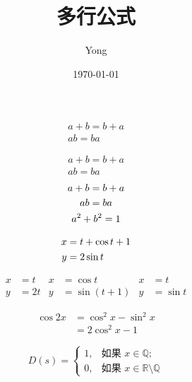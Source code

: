 \documentclass{article}
\title{多行公式}
\author{Yong}
\date{\today}
\begin{document}
	\maketitle
	
	\begin{gather}
		a + b = b + a \\
		ab = ba
	\end{gather}
	
	\begin{gather*}
	a + b = b + a \\
	ab = ba
	\end{gather*}
	\begin{gather}
	a + b = b + a \notag \\
	ab = ba \notag \\
	a^2 + b^2 = 1
	\end{gather}
	
	\begin{align}
		x &= t + \cos t + 1 \notag \\
		y &= 2\sin t
	\end{align}
	
	\begin{align*}
		x &= t & x &= \cos t & x &=t \\
		y &= 2t & y &= \sin (t + 1) & y &= \sin t
	\end{align*}
	
	\begin{equation}
		\begin{split}
			\cos 2x &= \cos^2 x - \sin^2 x \\
			&= 2\cos^2 x - 1
		\end{split}
	\end{equation}
	
	\begin{equation}
		D(s) = \begin{cases}
		1, & \text{如果 } x \in \mathbb{Q}; \\
		0, & \text{如果 } x \in \mathbb{R} \setminus\mathbb{Q}
		\end{cases}
	\end{equation}
\end{document}
